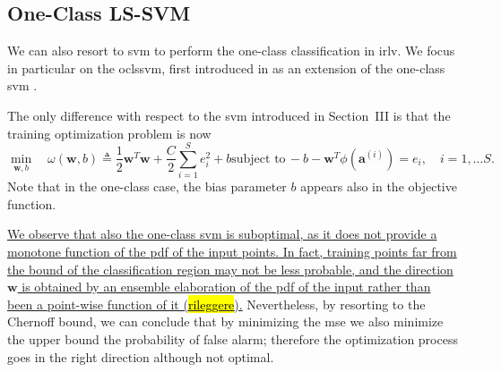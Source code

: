 \documentclass[draftcls,onecolumn,12pt]{IEEEtran}
\begin{document}
\subsection{One-Class LS-SVM}

We can also resort to \ac{svm} to perform the one-class classification in \ac{irlv}. We focus in particular on the  \ac{oclssvm}, first introduced in \cite{choi2009} as an extension of the one-class \ac{svm} \cite{Scholkopf2001estimating}. 

The only difference with respect to the \ac{svm} introduced in Section~III is that the training optimization problem is now
\begin{subequations}
	\label{eq:oneClassSvm}
	\begin{equation}
	\label{eq:oneClass1}
	\underset{\bm{w},b}{\min} \quad \omega(\bm{w}, b) \triangleq
	 \frac{1}{2} \bm{w}^T \bm{w} +  \frac{C}{2} \sum_{i=1}^S e_i^2 +b
	\end{equation}
	\begin{equation}
	\label{eq:oneClassConstr}
	\text{subject to}\, -b - \bm{w}^T \phi (\bm{a}^{(i)})  = e_i,  \quad i = 1,\dots S.
	\end{equation}
\end{subequations}
Note that in the one-class case, the bias parameter $b$ appears also in the objective function.


\uline{We observe that also the one-class \ac{svm} is suboptimal, as it does not provide a monotone function of the \ac{pdf} of the input points. In fact, training points far from the bound of the classification region may not be less probable, and the direction $\bm{w}$ is obtained by an ensemble elaboration of the \ac{pdf} of the input rather than been a point-wise function of it (\hl{rileggere}).} Nevertheless, by resorting to the Chernoff bound, we can conclude that by minimizing the \ac{mse} we also minimize the upper bound the probability of false alarm; therefore the optimization process goes in the right direction although not optimal.
\end{document}
